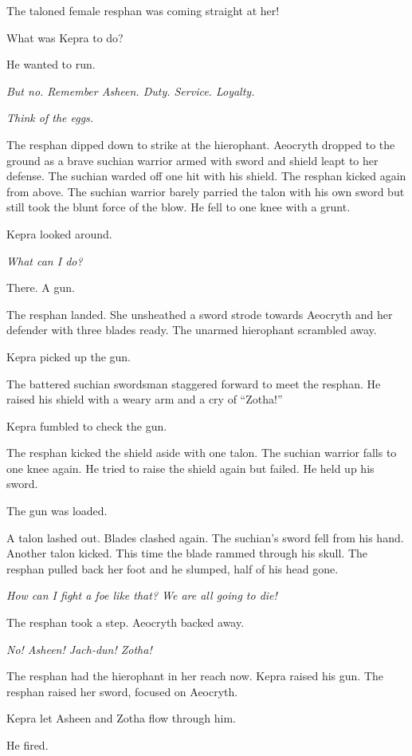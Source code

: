 \documentclass
  [a4paper,
   12pt,
   oneside
  ]%
  {article}
\begin{document}
The taloned female resphan was coming straight at her! 

What was Kepra to do? 

He wanted to run. 

\emph{But no. Remember Asheen. Duty. Service. Loyalty. }

\emph{Think of the eggs.}

The resphan dipped down to strike at the hierophant. 
Aeocryth dropped to the ground as a brave suchian warrior armed with sword and shield leapt to her defense. 
The suchian warded off one hit with his shield. 
The resphan kicked again from above. 
The suchian warrior barely parried the talon with his own sword but still took the blunt force of the blow. 
He fell to one knee with a grunt. 

Kepra looked around. 

\emph{What can I do?}

There. A gun. 

The resphan landed. She unsheathed a sword strode towards Aeocryth and her defender with three blades ready. The unarmed hierophant scrambled away. 

Kepra picked up the gun. 

The battered suchian swordsman staggered forward to meet the resphan. He raised his shield with a weary arm and a cry of ``Zotha!''

Kepra fumbled to check the gun. 

The resphan kicked the shield aside with one talon. 
The suchian warrior falls to one knee again. 
He tried to raise the shield again but failed. 
He held up his sword. 

The gun was loaded.

A talon lashed out. Blades clashed again. The suchian’s sword fell from his hand. Another talon kicked. This time the blade rammed through his skull. 
The resphan pulled back her foot and he slumped, half of his head gone.

\emph{How can I fight a foe like that? We are all going to die!}

The resphan took a step. Aeocryth backed away.

\emph{No! Asheen! Jach-dun! Zotha!}

The resphan had the hierophant in her reach now.
Kepra raised his gun. 
The resphan raised her sword, focused on Aeocryth. 

Kepra let Asheen and Zotha flow through him. 

He fired. 
\end{document}
